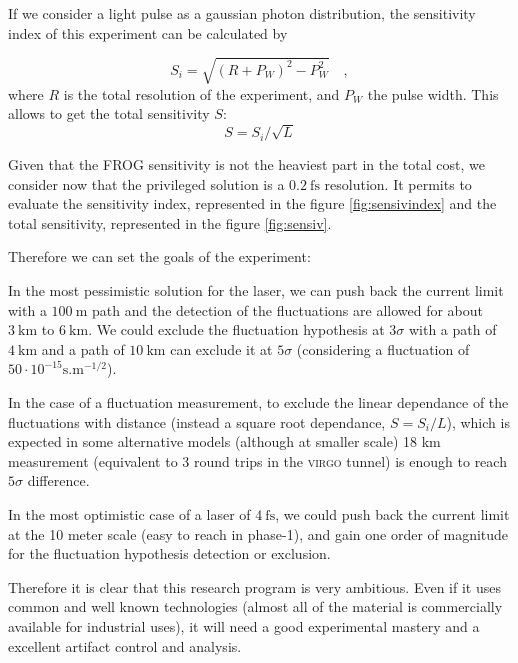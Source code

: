 \documentclass[9pt, a4, twoside]{article}
\begin{document}
If we consider a light pulse as a gaussian photon distribution, the sensitivity index of this experiment can be calculated by

\begin{displaymath}
S_i = \sqrt{(R+P_W)^2-P_W^2}\quad,
\end{displaymath}
where $R$ is the total resolution of the experiment, and $P_W$ the pulse width. This allows to get the total sensitivity $S$:
\begin{displaymath}
S=S_i/\sqrt{L}
\end{displaymath}

Given that the FROG sensitivity is not the heaviest part in the total cost, we consider now that the privileged solution is a $0.2~\mathrm{fs}$ resolution. It permits to evaluate the sensitivity index, represented in the figure \ref{fig:sensivindex} and the total sensitivity, represented in the figure \ref{fig:sensiv}.

Therefore we can set the goals of the experiment:

In the most pessimistic solution for the laser, we can push back the current limit with a $100~\mathrm{m}$ path and the detection of the fluctuations are allowed for about $3~\mathrm{km}$ to $6~\mathrm{km}$. We could exclude the fluctuation hypothesis at $3\sigma$ with a path of $4~\mathrm{km}$ and a path of $10~\mathrm{km}$ can exclude it at $5\sigma$ (considering a fluctuation of $50 \cdot10^{-15}\mathrm{s}.\mathrm{m}^{-1/2}$).


In the case of a fluctuation measurement, to exclude the linear dependance of the fluctuations with distance (instead a square root dependance, $S=S_i/L$), which is expected in some alternative models (although at smaller scale) 18 km measurement (equivalent to 3 round trips in the \textsc{virgo} tunnel) is enough to reach $5\sigma$ difference. %

In the most optimistic case of a laser of $4~\mathrm{fs}$, we could push back the current limit at the 10 meter scale (easy to reach in phase-1), and gain one order of magnitude for the fluctuation hypothesis detection or exclusion.

Therefore  it is clear that this research program is very ambitious. Even if it uses common and well known technologies (almost all of the material is commercially available for industrial uses), it will need a good experimental mastery and a excellent artifact control and analysis.
\end{document}
